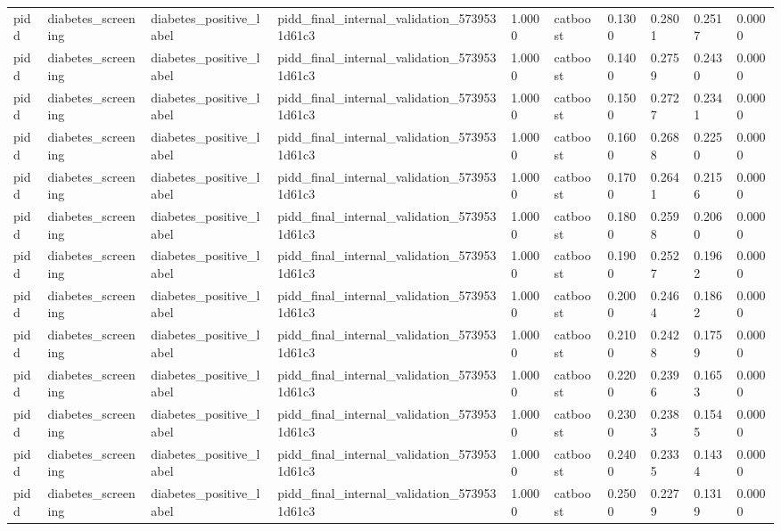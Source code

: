 \begin{tabular}{llllllllll}
pidd & diabetes\_screening & diabetes\_positive\_label & pidd\_final\_internal\_validation\_5739531d61c3 & 1.0000 & catboost & 0.1300 & 0.2801 & 0.2517 & 0.0000 \\
pidd & diabetes\_screening & diabetes\_positive\_label & pidd\_final\_internal\_validation\_5739531d61c3 & 1.0000 & catboost & 0.1400 & 0.2759 & 0.2430 & 0.0000 \\
pidd & diabetes\_screening & diabetes\_positive\_label & pidd\_final\_internal\_validation\_5739531d61c3 & 1.0000 & catboost & 0.1500 & 0.2727 & 0.2341 & 0.0000 \\
pidd & diabetes\_screening & diabetes\_positive\_label & pidd\_final\_internal\_validation\_5739531d61c3 & 1.0000 & catboost & 0.1600 & 0.2688 & 0.2250 & 0.0000 \\
pidd & diabetes\_screening & diabetes\_positive\_label & pidd\_final\_internal\_validation\_5739531d61c3 & 1.0000 & catboost & 0.1700 & 0.2641 & 0.2156 & 0.0000 \\
pidd & diabetes\_screening & diabetes\_positive\_label & pidd\_final\_internal\_validation\_5739531d61c3 & 1.0000 & catboost & 0.1800 & 0.2598 & 0.2060 & 0.0000 \\
pidd & diabetes\_screening & diabetes\_positive\_label & pidd\_final\_internal\_validation\_5739531d61c3 & 1.0000 & catboost & 0.1900 & 0.2527 & 0.1962 & 0.0000 \\
pidd & diabetes\_screening & diabetes\_positive\_label & pidd\_final\_internal\_validation\_5739531d61c3 & 1.0000 & catboost & 0.2000 & 0.2464 & 0.1862 & 0.0000 \\
pidd & diabetes\_screening & diabetes\_positive\_label & pidd\_final\_internal\_validation\_5739531d61c3 & 1.0000 & catboost & 0.2100 & 0.2428 & 0.1759 & 0.0000 \\
pidd & diabetes\_screening & diabetes\_positive\_label & pidd\_final\_internal\_validation\_5739531d61c3 & 1.0000 & catboost & 0.2200 & 0.2396 & 0.1653 & 0.0000 \\
pidd & diabetes\_screening & diabetes\_positive\_label & pidd\_final\_internal\_validation\_5739531d61c3 & 1.0000 & catboost & 0.2300 & 0.2383 & 0.1545 & 0.0000 \\
pidd & diabetes\_screening & diabetes\_positive\_label & pidd\_final\_internal\_validation\_5739531d61c3 & 1.0000 & catboost & 0.2400 & 0.2335 & 0.1434 & 0.0000 \\
pidd & diabetes\_screening & diabetes\_positive\_label & pidd\_final\_internal\_validation\_5739531d61c3 & 1.0000 & catboost & 0.2500 & 0.2279 & 0.1319 & 0.0000 \\

\end{tabular}
